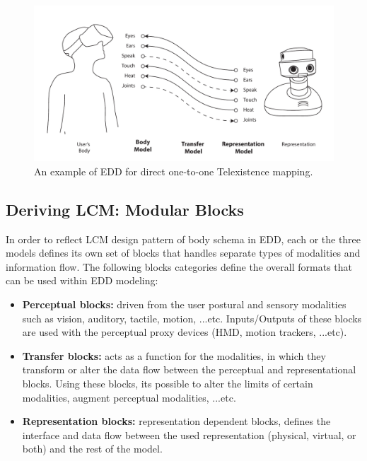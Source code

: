\begin{figure}[t!]
  \centering
  \includegraphics[width=1\linewidth]{figures/concept/EDD-Tx.pdf}
  \captionsetup{justification=centering}
  \caption{An example of EDD for direct one-to-one Telexistence mapping.}
  \label{fig:concept-EDD-TX}
\end{figure} 


\subsection{Deriving LCM: Modular Blocks}%

In order to reflect LCM design pattern of body schema in EDD, each or the three models defines its own set of blocks that handles separate types of modalities and information flow. The following blocks categories define the overall formats that can be used within EDD modeling:

\begin{itemize}
  	\setlength\itemsep{0em}
\item \textbf{Perceptual blocks:} driven from the user postural and sensory modalities such as vision, auditory, tactile, motion, ...etc. Inputs/Outputs of these blocks are used with the perceptual proxy devices (HMD, motion trackers, ...etc). 

\item \textbf{Transfer blocks:} acts as a function for the modalities, in which they transform or alter the data flow between the perceptual and representational blocks. Using these blocks, its possible to alter the limits of certain modalities, augment perceptual modalities, ...etc.

\item \textbf{Representation blocks:} representation dependent blocks, defines the interface and data flow between the used representation (physical, virtual, or both) and the rest of the model.

\end{itemize}


